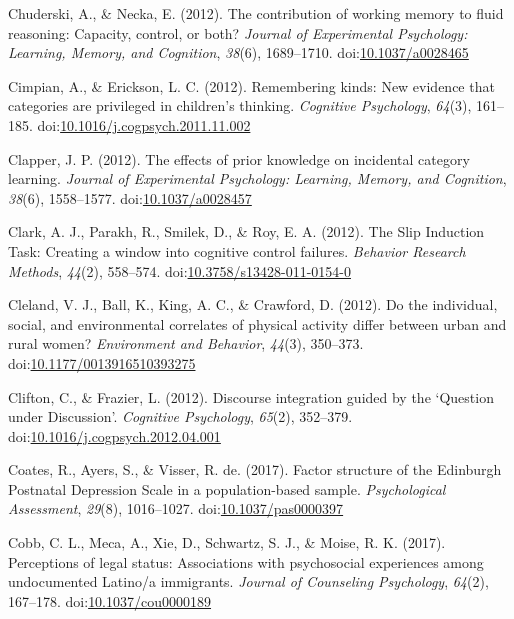 \documentclass[english,man]{apa6}
\theoremstyle{definition}
\theoremstyle{definition}
\theoremstyle{definition}
\theoremstyle{remark}
\begin{document}
\hypertarget{ref-Chuderski2012}{}
Chuderski, A., \& Necka, E. (2012). The contribution of working memory
to fluid reasoning: Capacity, control, or both? \emph{Journal of
Experimental Psychology: Learning, Memory, and Cognition}, \emph{38}(6),
1689--1710.
doi:\href{https://doi.org/10.1037/a0028465}{10.1037/a0028465}

\hypertarget{ref-Cimpian2012}{}
Cimpian, A., \& Erickson, L. C. (2012). Remembering kinds: New evidence
that categories are privileged in children's thinking. \emph{Cognitive
Psychology}, \emph{64}(3), 161--185.
doi:\href{https://doi.org/10.1016/j.cogpsych.2011.11.002}{10.1016/j.cogpsych.2011.11.002}

\hypertarget{ref-Clapper2012}{}
Clapper, J. P. (2012). The effects of prior knowledge on incidental
category learning. \emph{Journal of Experimental Psychology: Learning,
Memory, and Cognition}, \emph{38}(6), 1558--1577.
doi:\href{https://doi.org/10.1037/a0028457}{10.1037/a0028457}

\hypertarget{ref-Clark2012}{}
Clark, A. J., Parakh, R., Smilek, D., \& Roy, E. A. (2012). The Slip
Induction Task: Creating a window into cognitive control failures.
\emph{Behavior Research Methods}, \emph{44}(2), 558--574.
doi:\href{https://doi.org/10.3758/s13428-011-0154-0}{10.3758/s13428-011-0154-0}

\hypertarget{ref-Cleland2012}{}
Cleland, V. J., Ball, K., King, A. C., \& Crawford, D. (2012). Do the
individual, social, and environmental correlates of physical activity
differ between urban and rural women? \emph{Environment and Behavior},
\emph{44}(3), 350--373.
doi:\href{https://doi.org/10.1177/0013916510393275}{10.1177/0013916510393275}

\hypertarget{ref-Clifton2012}{}
Clifton, C., \& Frazier, L. (2012). Discourse integration guided by the
`Question under Discussion'. \emph{Cognitive Psychology}, \emph{65}(2),
352--379.
doi:\href{https://doi.org/10.1016/j.cogpsych.2012.04.001}{10.1016/j.cogpsych.2012.04.001}

\hypertarget{ref-Coates2016}{}
Coates, R., Ayers, S., \& Visser, R. de. (2017). Factor structure of the
Edinburgh Postnatal Depression Scale in a population-based sample.
\emph{Psychological Assessment}, \emph{29}(8), 1016--1027.
doi:\href{https://doi.org/10.1037/pas0000397}{10.1037/pas0000397}

\hypertarget{ref-Cobb2017}{}
Cobb, C. L., Meca, A., Xie, D., Schwartz, S. J., \& Moise, R. K. (2017).
Perceptions of legal status: Associations with psychosocial experiences
among undocumented Latino/a immigrants. \emph{Journal of Counseling
Psychology}, \emph{64}(2), 167--178.
doi:\href{https://doi.org/10.1037/cou0000189}{10.1037/cou0000189}
\end{document}
